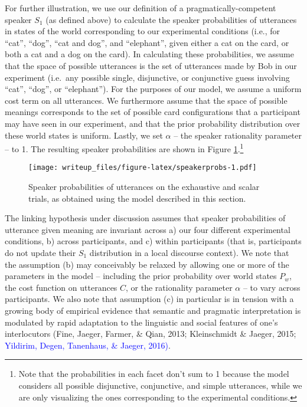 \documentclass[man]{apa6}
\newcommand{\change}[1]{\textcolor{Blue}{#1}}
\theoremstyle{definition}
\theoremstyle{definition}
\theoremstyle{definition}
\theoremstyle{remark}
\begin{document}
For further illustration, we use our definition of a
pragmatically-competent speaker \(S_1\) (as defined above) to calculate
the speaker probabilities of utterances in states of the world
corresponding to our experimental conditions (i.e., for \enquote{cat},
\enquote{dog}, \enquote{cat and dog}, and \enquote{elephant}, given
either a cat on the card, or both a cat and a dog on the card). In
calculating these probabilities, we assume that the space of possible
utterances is the set of utterances made by Bob in our experiment
(i.e.~any possible single, disjunctive, or conjunctive guess involving
\enquote{cat}, \enquote{dog}, or \enquote{elephant}). For the purposes
of our model, we assume a uniform cost term on all utterances. We
furthermore assume that the space of possible meanings corresponds to
the set of possible card configurations that a participant may have seen
in our experiment, and that the prior probability distribution over
these world states is uniform. Lastly, we set \(\alpha\) -- the speaker
rationality parameter -- to 1. The resulting speaker probabilities are
shown in Figure \ref{fig:speakerprobs}.\footnote{Note that the
  probabilities in each facet don't sum to 1 because the model considers
  all possible disjunctive, conjunctive, and simple utterances, while we
  are only visualizing the ones corresponding to the experimental
  conditions.}

\begin{figure}
\centering
\texttt{[image: writeup\_files/figure-latex/speakerprobs-1.pdf]}
\caption{\label{fig:speakerprobs}Speaker probabilities of utterances on the
exhaustive and scalar trials, as obtained using the model described in
this section.}
\end{figure}

The linking hypothesis under discussion assumes that speaker
probabilities of utterance given meaning are invariant across a) our
four different experimental conditions, b) across participants, and c)
within participants (that is, participants do not update
their \(S_1\) distribution in a local discourse context). We note that
the assumption (b) may conceivably be relaxed by allowing one or more of
the parameters in the model -- including the prior probability over
world states \(P_w\), the cost function on utterances \(C\), or the
rationality parameter \(\alpha\) -- to vary across participants. We also
note that assumption (c) in particular is in tension with a growing body
of empirical evidence that semantic and pragmatic interpretation is
modulated by rapid adaptation to the linguistic and social features of
one's interlocutors (Fine, Jaeger, Farmer, \& Qian, 2013; Kleinschmidt
\& Jaeger, 2015; \change{Yildirim, Degen, Tanenhaus, \& Jaeger, 2016)}.
\end{document}
